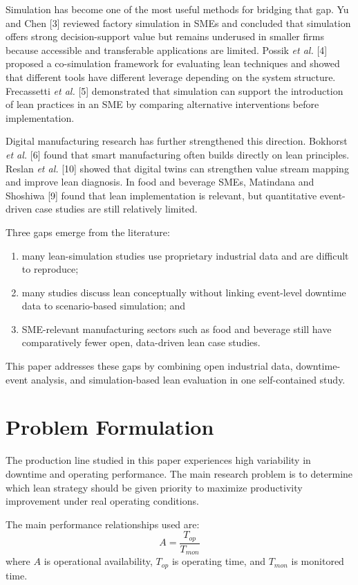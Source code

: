 \documentclass[conference]{IEEEtran}
\begin{document}
Simulation has become one of the most useful methods for bridging that gap. Yu and Chen [3] reviewed factory simulation in SMEs and concluded that simulation offers strong decision-support value but remains underused in smaller firms because accessible and transferable applications are limited. Possik \emph{et al.} [4] proposed a co-simulation framework for evaluating lean techniques and showed that different tools have different leverage depending on the system structure. Frecassetti \emph{et al.} [5] demonstrated that simulation can support the introduction of lean practices in an SME by comparing alternative interventions before implementation.

Digital manufacturing research has further strengthened this direction. Bokhorst \emph{et al.} [6] found that smart manufacturing often builds directly on lean principles. Reslan \emph{et al.} [10] showed that digital twins can strengthen value stream mapping and improve lean diagnosis. In food and beverage SMEs, Matindana and Shoshiwa [9] found that lean implementation is relevant, but quantitative event-driven case studies are still relatively limited.

Three gaps emerge from the literature:
\begin{enumerate}
    \item many lean-simulation studies use proprietary industrial data and are difficult to reproduce;
    \item many studies discuss lean conceptually without linking event-level downtime data to scenario-based simulation; and
    \item SME-relevant manufacturing sectors such as food and beverage still have comparatively fewer open, data-driven lean case studies.
\end{enumerate}

This paper addresses these gaps by combining open industrial data, downtime-event analysis, and simulation-based lean evaluation in one self-contained study.

\section{Problem Formulation}
The production line studied in this paper experiences high variability in downtime and operating performance. The main research problem is to determine which lean strategy should be given priority to maximize productivity improvement under real operating conditions.

The main performance relationships used are:
\begin{equation}
A = \frac{T_{op}}{T_{mon}}
\end{equation}
where $A$ is operational availability, $T_{op}$ is operating time, and $T_{mon}$ is monitored time.
\end{document}

